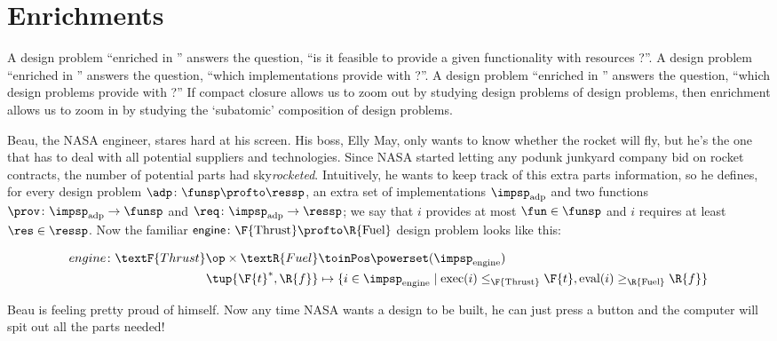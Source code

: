 
\section{Enrichments}
\label{sec:enriched}


A design problem ``enriched in \Bool'' answers the question, ``is it feasible to provide a given functionality \fun with resources \res?''.
A design problem ``enriched in \Set'' answers the question, ``which implementations provide \fun with \res?''.
A design problem ``enriched in \DP'' answers the question, ``which design problems provide \fun with \res?''
If compact closure allows us to zoom out by studying design problems of design problems, then enrichment allows us to zoom in by studying the `subatomic' composition of design problems.

\begin{example}
    \label{ex:dpi_example}
    Beau, the NASA engineer, stares hard at his screen.
    His boss, Elly May, only wants to know whether the rocket will fly, but he's the one that has to deal with all potential suppliers and technologies.
    Since NASA started letting any podunk junkyard company bid on rocket contracts, the number of potential parts had sky\emph{rocketed}.
    Intuitively, he wants to keep track of this extra parts information, so he defines, for every design problem $\adp \colon \funsp \profto \ressp$, an extra set of implementations $\impsp_\text{adp}$ and two functions $\prov\colon \impsp_\text{adp} \to \funsp$ and  $\req\colon \impsp_\text{adp} \to \ressp$; we say that $i$ provides at most $\fun \in \funsp$ and $i$ requires at least $\res \in \ressp$.
    Now the familiar $\mathsf{engine} \colon \F{\text{Thrust}} \profto \R{\text{Fuel}}$ design problem looks like this:
    \begin{widepar}
        \begin{equation*}
            \begin{aligned}
                engine \colon \textF{Thrust}\op \times \textR{Fuel} & \toinPos \powerset(\impsp_\text{engine})                                                                                             \\
                \tup{\F{t}^*,\R{f}}                                 & \mapsto \{ i \in \impsp_\text{engine} \mid \text{exec}(i) \leq_\F{\text{Thrust}} \F{t}, \text{eval}(i) \geq_\R{\text{Fuel}} \R{f} \}
            \end{aligned}
        \end{equation*}
    \end{widepar}
    Beau is feeling pretty proud of himself.
    Now any time NASA wants a design to be built, he can just press a button and the computer will spit out all the parts needed!
\end{example}

